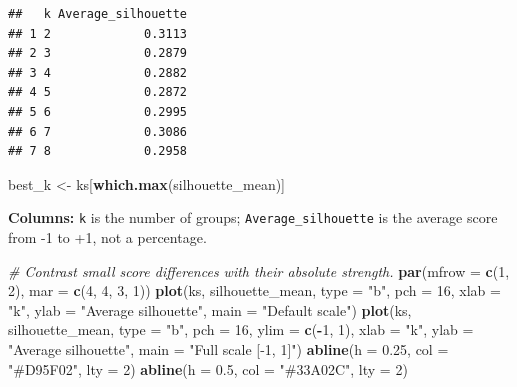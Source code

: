 \documentclass[
  10pt,
]{article}
\newenvironment{Shaded}{\begin{snugshade}}{\end{snugshade}}
\newcommand{\AttributeTok}[1]{\textcolor[rgb]{0.13,0.29,0.53}{#1}}
\newcommand{\CommentTok}[1]{\textcolor[rgb]{0.56,0.35,0.01}{\textit{#1}}}
\newcommand{\DecValTok}[1]{\textcolor[rgb]{0.00,0.00,0.81}{#1}}
\newcommand{\FloatTok}[1]{\textcolor[rgb]{0.00,0.00,0.81}{#1}}
\newcommand{\FunctionTok}[1]{\textcolor[rgb]{0.13,0.29,0.53}{\textbf{#1}}}
\newcommand{\NormalTok}[1]{#1}
\newcommand{\OtherTok}[1]{\textcolor[rgb]{0.56,0.35,0.01}{#1}}
\newcommand{\SpecialCharTok}[1]{\textcolor[rgb]{0.81,0.36,0.00}{\textbf{#1}}}
\newcommand{\StringTok}[1]{\textcolor[rgb]{0.31,0.60,0.02}{#1}}
\begin{document}
\begin{verbatim}
##   k Average_silhouette
## 1 2             0.3113
## 2 3             0.2879
## 3 4             0.2882
## 4 5             0.2872
## 5 6             0.2995
## 6 7             0.3086
## 7 8             0.2958
\end{verbatim}

\begin{Shaded}
\begin{Highlighting}[]
\NormalTok{best\_k }\OtherTok{\textless{}{-}}\NormalTok{ ks[}\FunctionTok{which.max}\NormalTok{(silhouette\_mean)]}
\end{Highlighting}
\end{Shaded}

\textbf{Columns:} \texttt{k} is the number of groups;
\texttt{Average\_silhouette} is the average score from -1 to +1, not a
percentage.

\begin{Shaded}
\begin{Highlighting}[]
\CommentTok{\# Contrast small score differences with their absolute strength.}
\FunctionTok{par}\NormalTok{(}\AttributeTok{mfrow =} \FunctionTok{c}\NormalTok{(}\DecValTok{1}\NormalTok{, }\DecValTok{2}\NormalTok{), }\AttributeTok{mar =} \FunctionTok{c}\NormalTok{(}\DecValTok{4}\NormalTok{, }\DecValTok{4}\NormalTok{, }\DecValTok{3}\NormalTok{, }\DecValTok{1}\NormalTok{))}
\FunctionTok{plot}\NormalTok{(ks, silhouette\_mean, }\AttributeTok{type =} \StringTok{"b"}\NormalTok{, }\AttributeTok{pch =} \DecValTok{16}\NormalTok{,}
     \AttributeTok{xlab =} \StringTok{"k"}\NormalTok{, }\AttributeTok{ylab =} \StringTok{"Average silhouette"}\NormalTok{, }\AttributeTok{main =} \StringTok{"Default scale"}\NormalTok{)}
\FunctionTok{plot}\NormalTok{(ks, silhouette\_mean, }\AttributeTok{type =} \StringTok{"b"}\NormalTok{, }\AttributeTok{pch =} \DecValTok{16}\NormalTok{, }\AttributeTok{ylim =} \FunctionTok{c}\NormalTok{(}\SpecialCharTok{{-}}\DecValTok{1}\NormalTok{, }\DecValTok{1}\NormalTok{),}
     \AttributeTok{xlab =} \StringTok{"k"}\NormalTok{, }\AttributeTok{ylab =} \StringTok{"Average silhouette"}\NormalTok{, }\AttributeTok{main =} \StringTok{"Full scale [{-}1, 1]"}\NormalTok{)}
\FunctionTok{abline}\NormalTok{(}\AttributeTok{h =} \FloatTok{0.25}\NormalTok{, }\AttributeTok{col =} \StringTok{"\#D95F02"}\NormalTok{, }\AttributeTok{lty =} \DecValTok{2}\NormalTok{)}
\FunctionTok{abline}\NormalTok{(}\AttributeTok{h =} \FloatTok{0.5}\NormalTok{, }\AttributeTok{col =} \StringTok{"\#33A02C"}\NormalTok{, }\AttributeTok{lty =} \DecValTok{2}\NormalTok{)}
\end{Highlighting}
\end{Shaded}
\end{document}
